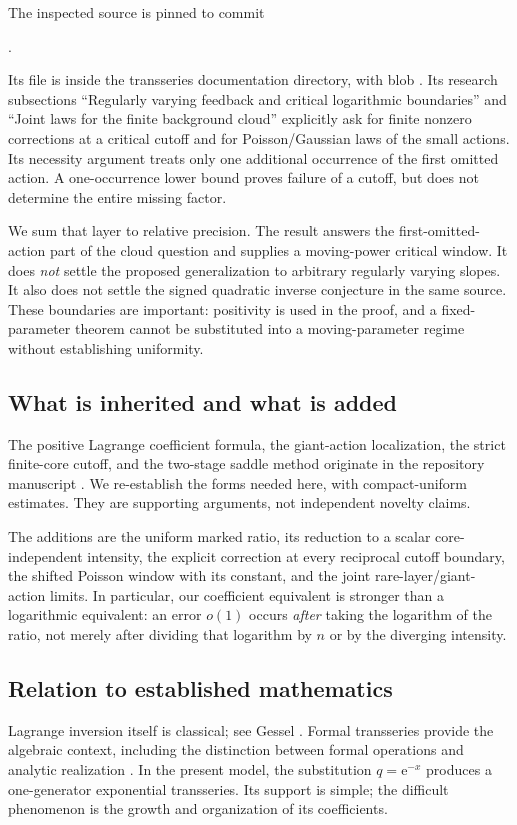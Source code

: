 \documentclass[11pt,a4paper]{article}
\numberwithin{equation}{section}
\theoremstyle{definition}
\theoremstyle{remark}
\newcommand{\ee}{\mathrm e}\newcommand{\dd}{\mathrm d}
\begin{document}
The inspected source is pinned to commit
\begin{center}\small
{}.
\end{center}
Its file is 
inside the transseries documentation directory, with blob
.
Its research subsections ``Regularly varying feedback and critical
logarithmic boundaries'' and ``Joint laws for the finite background cloud''
explicitly ask for finite nonzero corrections at a critical cutoff and for
Poisson/Gaussian laws of the small actions. Its necessity argument treats
only one additional occurrence of the first omitted action. A one-occurrence
lower bound proves failure of a cutoff, but does not determine the entire
missing factor.

We sum that layer to relative precision. The result answers the first-omitted-
action part of the cloud question and supplies a moving-power critical
window. It does \emph{not} settle the proposed generalization to arbitrary
regularly varying slopes. It also does not settle the signed quadratic
inverse conjecture in the same source. These boundaries are important:
positivity is used in the proof, and a fixed-parameter theorem cannot be
substituted into a moving-parameter regime without establishing uniformity.

\subsection{What is inherited and what is added}
The positive Lagrange coefficient formula, the giant-action localization,
the strict finite-core cutoff, and the two-stage saddle method originate in
the repository manuscript \cite{finite-core}. We re-establish the forms
needed here, with compact-uniform estimates. They are supporting arguments,
not independent novelty claims.

The additions are the uniform marked ratio, its reduction to a scalar
core-independent intensity, the explicit correction at every reciprocal
cutoff boundary, the shifted Poisson window with its constant, and the joint
rare-layer/giant-action limits. In particular, our coefficient equivalent is
stronger than a logarithmic equivalent: an error $o(1)$ occurs \emph{after}
taking the logarithm of the ratio, not merely after dividing that logarithm
by $n$ or by the diverging intensity.

\subsection{Relation to established mathematics}
Lagrange inversion itself is classical; see Gessel \cite{gessel}. Formal
transseries provide the algebraic context, including the distinction between
formal operations and analytic realization \cite{edgar}. In the present
model, the substitution $q=\ee^{-x}$ produces a one-generator exponential
transseries. Its support is simple; the difficult phenomenon is the growth
and organization of its coefficients.
\end{document}
